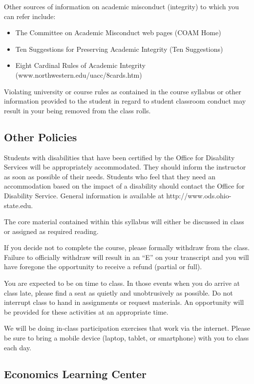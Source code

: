 \documentclass[12pt]{article}
\begin{document}
Other sources of information on academic misconduct (integrity) to which you can refer include:
\begin{itemize}
    \item The Committee on Academic Misconduct web pages (COAM Home)
    \item Ten Suggestions for Preserving Academic Integrity (Ten Suggestions)
    \item Eight Cardinal Rules of Academic Integrity (www.northwestern.edu/uacc/8cards.htm)
\end{itemize}

Violating university or course rules as contained in the course syllabus or other information provided to the student in regard to student classroom conduct may result in your being removed from the class rolls.

\subsection*{Other Policies}

Students with disabilities that have been certified by the Office for Disability Services will be appropriately accommodated.
They should inform the instructor as soon as possible of their needs.
Students who feel that they need an accommodation based on the impact of a disability should contact the Office for Disability Service.
General information is available at http://www.ods.ohio-state.edu.

The core material contained within this syllabus will either be discussed in class or assigned as required reading.

If you decide not to complete the course, please formally withdraw from the class.
Failure to officially withdraw will result in an ``E'' on your transcript and you will have foregone the opportunity to receive a refund (partial or full).

You are expected to be on time to class.
In those events when you do arrive at class late, please find a seat as quietly and unobtrusively as possible.
Do not interrupt class to hand in assignments or request materials.
An opportunity will be provided for these activities at an appropriate time.

We will be doing in-class participation exercises that work via the internet.
Please be sure to bring a mobile device (laptop, tablet, or smartphone) with you to class each day.

\subsection*{Economics Learning Center}
\end{document}
